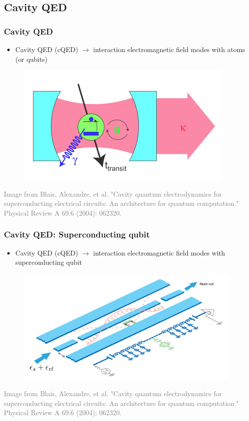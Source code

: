 \documentclass[xcolor=dvipsnames,hyperref={CJKbookmarks=true}]{beamer}
\begin{document}
\subsection{Cavity QED}
\begin{frame}
\frametitle{Cavity QED}
\begin{itemize}
\item Cavity QED (cQED) $\rightarrow$ interaction electromagnetic field modes with atoms (or qubits)
\end{itemize}
\begin{figure}
\centering
\includegraphics[width=0.8\linewidth]{cQED-atom.pdf}
\end{figure}
\tiny{\textcolor{gray}{Image from Blais, Alexandre, et al. "Cavity quantum electrodynamics for superconducting electrical circuits: An architecture for quantum computation." Physical Review A 69.6 (2004): 062320.\cite{blais2004cavity}}}
\end{frame}

\begin{frame}
\frametitle{Cavity QED: Superconducting qubit}
\begin{itemize}
\item Cavity QED (cQED) $\rightarrow$ interaction electromagnetic field modes with superconducting qubit
\end{itemize}
\begin{figure}
\centering
\includegraphics[width=0.8\linewidth]{cavity.png}
\end{figure}
\tiny{\textcolor{gray}{Image from Blais, Alexandre, et al. "Cavity quantum electrodynamics for superconducting electrical circuits: An architecture for quantum computation." Physical Review A 69.6 (2004): 062320.\cite{blais2004cavity}}}
\end{frame}
\end{document}
